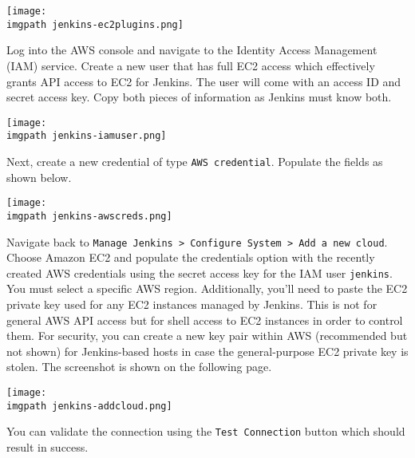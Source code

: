     \begin{minipage}[t]{\linewidth}
	  \centering
      \texttt{[image: \\imgpath jenkins-ec2plugins.png]}
    \end{minipage}

Log into the AWS console and navigate to the Identity Access Management (IAM)
service. Create a new user that has full EC2 access which effectively grants
API access to EC2 for Jenkins. The user will come with an access ID and secret
access key. Copy both pieces of information as Jenkins must know both.

    \begin{minipage}[t]{\linewidth}
	  \centering
      \texttt{[image: \\imgpath jenkins-iamuser.png]}
    \end{minipage}

Next, create a new credential of type \verb|AWS credential|. Populate the
fields as shown below.

    \begin{minipage}[t]{\linewidth}
	  \centering
      \texttt{[image: \\imgpath jenkins-awscreds.png]}
    \end{minipage}

Navigate back to \verb|Manage Jenkins > Configure System > Add a new cloud|.
Choose Amazon EC2 and populate the credentials option with the recently
created AWS credentials using the secret access key for the IAM user
\verb|jenkins|. You must select a specific AWS region. Additionally, you'll
need to paste the EC2 private key used for any EC2 instances managed by
Jenkins. This is not for general AWS API access but for shell access to EC2
instances in order to control them. For security, you can create a new key
pair within AWS (recommended but not shown) for Jenkins-based hosts in case
the general-purpose EC2 private key is stolen. The screenshot is shown on the
following page.

    \begin{minipage}[t]{\linewidth}
	  \centering
      \texttt{[image: \\imgpath jenkins-addcloud.png]}
    \end{minipage}

You can validate the connection using the \verb|Test Connection| button which
should result in success.

